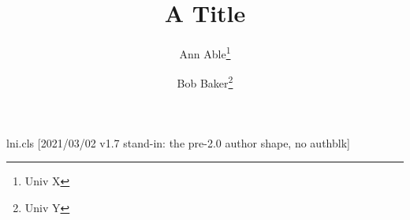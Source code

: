\begin{filecontents*}[overwrite]{lni.cls}
[2021/03/02 v1.7 stand-in: the pre-2.0 author shape, no authblk]
\renewcommand{\author}{\@dblarg\@@author}
\newcommand{\@@author}[2][]{\gdef\@shortauthor{#1}\gdef\@author{#2}}
\newcommand{\startpage}[1]{\setcounter{page}{#1}}
\end{filecontents*}
\documentclass{lni}

\title{A Title}
\author[Ann Able \and Bob Baker]{Ann Able\footnote{Univ X} \and Bob Baker\footnote{Univ Y}}
\maketitle
Body text.

